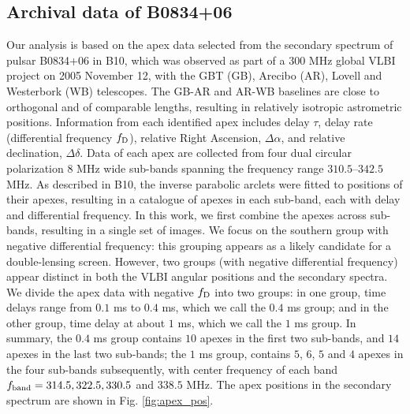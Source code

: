 \documentclass[useAMS,usenatbib]{mn2e}
\begin{document}
\subsection{Archival data of B0834+06}
\label{21}
Our analysis is based on the apex data selected from the secondary
spectrum of pulsar B0834+06 in B10, which was
observed as part of a 300 MHz global VLBI project on 2005 November 12, with
the GBT (GB), Arecibo (AR), Lovell and Westerbork (WB) telescopes.  The GB-AR and AR-WB
baselines are close to orthogonal and of comparable lengths, resulting
in relatively isotropic astrometric positions.
Information from each identified apex includes delay $\tau$,
delay rate (differential frequency $f_{\rm D}$), relative Right Ascension,
$\Delta\alpha$, and relative declination, $\Delta\delta$.
Data of each apex are collected from four dual circular polarization $8$ MHz wide sub-bands spanning the frequency range $310.5$--$342.5$ MHz. 
As described in B10, the inverse parabolic
arclets were fitted to positions of their apexes, resulting in a
catalogue of apexes in each sub-band, each with delay and differential
frequency.  
In this work, we first combine the
apexes across sub-bands, resulting in a single set of images.  We focus on
the southern group with negative differential frequency: this
grouping appears as a likely candidate for a double-lensing screen.  However, two groups (with negative differential frequency) appear distinct in both the VLBI angular positions and the secondary spectra.  We divide the apex data with negative $f_{\rm D}$ into two
groups: in one group, time delays range from $0.1$ ms to $0.4$ ms,
which we call the $0.4$ ms group; and in the other group, time delay at
about $1$ ms, which we call the $1$ ms group.  In summary, the
$0.4$ ms group contains $10$ apexes in the first two sub-bands, and
$14$ apexes in the last two sub-bands; the $1$ ms group, contains $5$,
$6$, $5$ and $4$ apexes in the four sub-bands subsequently, with
center frequency of each band $f_{\rm band}=314.5, 322.5, 330.5$ and $
338.5$ MHz.  The apex positions in the secondary spectrum are shown
in Fig. \ref{fig:apex_pos}. 
\end{document}
